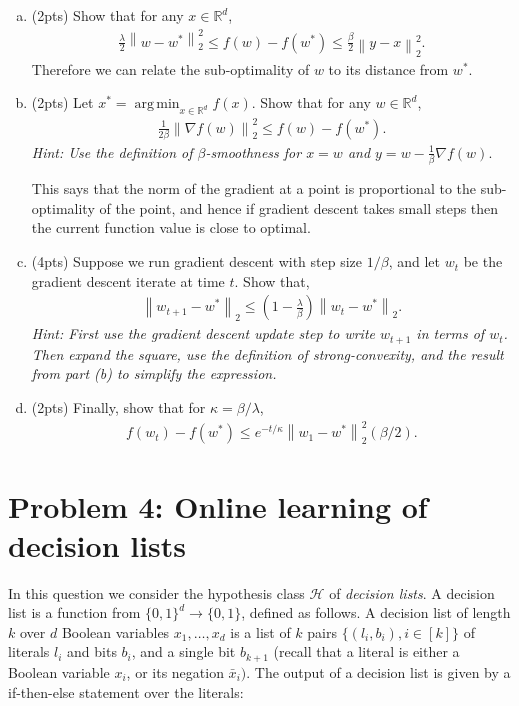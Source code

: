 \documentclass[11pt]{article}
\DeclareMathOperator*{\argmin}{arg\,min}
\newcommand{\calH}{{\mathcal{H}}}
\newcommand{\blue}[1]{{\color{blue}#1}}
\newcommand{\R}{\mathbb{R}}
\newcommand{\twonorm}[1]{\left\| #1\right\|_2}
\begin{document}
\begin{enumerate}[(a)]
    
    \item (\blue{2pts}) Show that for any $x\in \R^d$,
    \begin{align*}
       \frac{\lambda}{2} \twonorm{w-w^*}^2 \le f(w)-f(w^*) \le \frac{\beta}{2}\twonorm{y-x}^2.
    \end{align*}
    Therefore we can relate the sub-optimality of $w$ to its distance from $w^*$.
    \item (\blue{2pts}) Let $x^*=\argmin_{x\in \R^d} f(x)$. Show that for any $w\in \R^d$,
    \begin{align*}
       \frac{1}{2\beta} \twonorm{\nabla f(w)}^2 \le f(w)-f(w^*) .
    \end{align*}
    \emph{Hint: Use the definition of $\beta$-smoothness for $x=w$ and $y=w-\frac{1}{\beta}\nabla f(w)$}.
    
    This says that the norm of the gradient at a point is proportional to the sub-optimality of the point, and hence if gradient descent  takes small steps then the current function value is close to optimal.
    \item (\blue{4pts}) Suppose we run gradient descent with step size $1/\beta$, and let $w_t$ be the gradient descent iterate at time $t$. Show that,
    \begin{align*}
        \twonorm{w_{t+1}-w^*} \le \left(1-\frac{\lambda}{\beta}\right)\twonorm{w_{t}-w^*}.
    \end{align*}
    \emph{Hint: First use the gradient descent update step to write $w_{t+1}$ in terms of $w_t$. Then expand the square, use the definition of strong-convexity, and the result from part (b) to simplify the expression.}
    \item (\blue{2pts}) Finally, show that for $\kappa=\beta/\lambda$,
    \begin{align*}
        f(w_t)-f(w^*) \le e^{-t/\kappa}\twonorm{w_1-w^*}^2(\beta/2).
    \end{align*}
\end{enumerate}

\section*{Problem 4: Online learning of decision lists}

In this question we consider the hypothesis class $\calH$ of \emph{decision lists}. A decision list is a function from $\{0,1\}^d \rightarrow \{0,1\}$, defined as follows. A decision list of length $k$ over $d$ Boolean variables $x_1,\dots, x_d$ is a list of $k$ pairs $\{(l_i,b_i), i \in [k]\}$ of literals $l_i$ and bits $b_i$, and a single bit $b_{k+1}$ (recall that a literal is either a Boolean variable $x_i$, or its negation $\bar{x}_i)$. The output of a decision list is given by a if-then-else statement over the literals:
\end{document}
